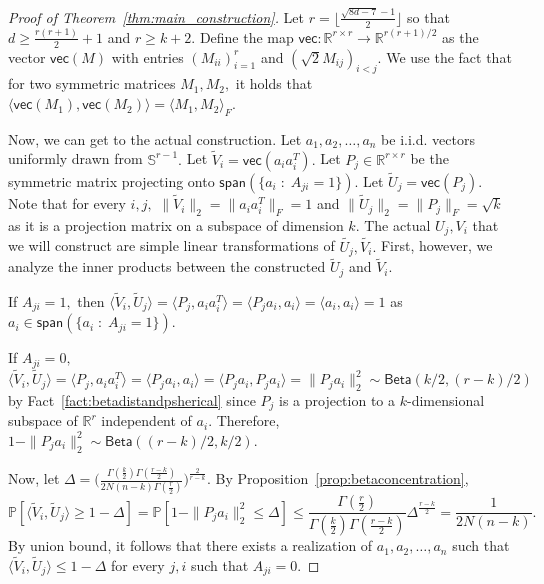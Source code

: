 \documentclass[preprint]{article}
\newcommand{\Betadist}{\mathsf{Beta}}
\newcommand{\prob}{\mathbb{P}}
\newcommand{\tV}{\widetilde{V}}
\newcommand{\tU}{\widetilde{U}}
\newcommand{\vectorize}{\mathsf{vec}}
\begin{document}
\begin{proof}[Proof of Theorem~\ref{thm:main_construction}] Let $r = \lfloor \frac{\sqrt{8d-7}-1}{2}\rfloor$ so that $d\ge \frac{r(r+1)}{2} + 1$ and $r\ge k+2.$ Define the map $\vectorize:\mathbb{R}^{r\times r}\longrightarrow \mathbb{R}^{r(r+1)/2}$ as the vector $\vectorize(M)$ with entries $(M_{ii})_{i = 1}^r$ and $(\sqrt{2}M_{ij})_{i<j}.$ We use the fact that for two symmetric matrices $M_1, M_2,$ it holds that $\langle \vectorize(M_1), \vectorize(M_2)\rangle = \langle M_1, M_2\rangle_F.$

Now, we can get to the actual construction. Let $a_1, a_2, \ldots, a_n$ be i.i.d. vectors uniformly drawn from $\mathbb{S}^{r-1}.$ Let $\tV_i = \vectorize(a_ia_i^T).$ Let $P_j\in \mathbb{R}^{r\times r}$ be the symmetric matrix projecting onto $\mathsf{span}(\{a_i\; : \; A_{ji} = 1\}).$ Let $\tU_j = \vectorize(P_j).$ Note that for every $i,j,$ $\|\tV_i\|_2 = \|a_ia_i^T\|_F = 1$ and 
$\|\tU_j\|_2 = \|P_j\|_F = \sqrt{k}$ as it is a projection matrix on a subspace of dimension $k.$ The actual $U_j,V_i$ that we will construct are simple linear transformations of $\widetilde{U_j}, \widetilde{V_i}.$ First, however, we analyze the inner products between the constructed $\tU_j$ and $\tV_i.$ 

If $A_{ji} = 1,$ then $\langle \tV_i, \tU_j\rangle = \langle P_j, a_ia_i^T\rangle = \langle P_ja_i, a_i\rangle  = 
\langle a_i, a_i\rangle = 1$ as $a_i \in \mathsf{span}(\{a_i\; : \; A_{ji} = 1\}).$ 

If $A_{ji} = 0,$
$\langle \tV_i, \tU_j\rangle = \langle P_j, a_ia_i^T\rangle = \langle P_ja_i, a_i\rangle  = 
\langle P_ja_i, P_ja_i\rangle = \|P_ja_i\|_2^2 \sim \Betadist(k/2, (r-k)/2)$ by Fact~\ref{fact:betadistandpsherical} since $P_j$ is a projection to a $k$-dimensional subspace of $\mathbb{R}^{r}$ independent of $a_i.$ Therefore, $1 - \|P_ja_i\|_2^2 \sim \Betadist((r-k)/2, k/2).$ 

Now, let $\Delta = \Bigg(\frac{\Gamma(\frac{k}{2})\Gamma(\frac{r-k}{2})}{2N(n-k)\Gamma(\frac{r}{2})}\Bigg)^{\frac{2}{r-k}}.$ By Proposition~\ref{prop:betaconcentration},
$$
\prob[\langle \tV_i, \tU_j\rangle\ge 1-\Delta ] = 
\prob[1 - \|P_ja_i\|_2^2 \le \Delta]\le 
\frac{\Gamma(\frac{r}{2})}{\Gamma(\frac{k}{2})\Gamma(\frac{r-k}{2})}\Delta^{\frac{r-k}{2}}= \frac{1}{2N(n-k)}.
$$
By union bound, it follows that there exists a realization of $a_1, a_2, \ldots, a_n$ such that 
$\langle \tV_i, \tU_j\rangle \le 1 - \Delta$ for every $j,i$ such that $A_{ji} = 0.$


\end{proof}
\end{document}
